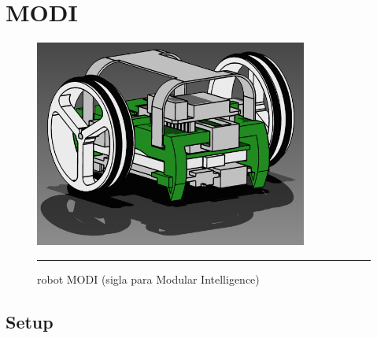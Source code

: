 
\chapter{MODI} %

\label{Chapter3} %



\begin{figure}[htbp]
	\centering
		\includegraphics[width=0.8\textwidth]{./Figures/MODI/render.png}
		\rule{35em}{0.5pt}
	\caption[modi]{robot MODI (sigla para Modular Intelligence)}
	\label{fig:MODI}
\end{figure}

\section{Setup}

